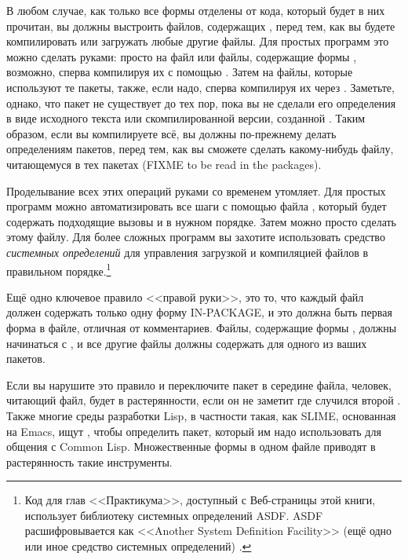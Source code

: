 В любом случае, как только все формы  отделены от кода, который будет в
них прочитан, вы должны выстроить  файлов, содержащих , перед
тем, как вы будете компилировать или загружать любые другие файлы. Для простых программ
это можно сделать руками: просто  на файл или файлы, содержащие формы
, возможно, сперва компилируя их с помощью . Затем
 на файлы, которые используют те пакеты, также, если надо, сперва компилируя их
через . Заметьте, однако, что пакет не существует до тех пор, пока вы
не сделали  его определения в виде исходного текста или скомпилированной
версии, созданной . Таким образом, если вы компилируете всё, вы должны
по-прежнему делать  определениям пакетов, перед тем, как вы сможете сделать
 какому-нибудь файлу, читающемуся в тех пакетах (FIXME to be read in
the packages).

Проделывание всех этих операций руками со временем утомляет.  Для простых программ можно
автоматизировать все шаги с помощью файла , который будет содержать
подходящие вызовы  и  в нужном порядке. Затем можно просто
сделать  этому файлу. Для более сложных программ вы захотите использовать
средство \textit{системных определений} для управления загрузкой и компиляцией файлов в
правильном порядке.\footnote{Код для глав <<Практикума>>, доступный с Веб-страницы этой
  книги, использует библиотеку системных определений ASDF. ASDF расшифровывается как
  <<Another System Definition Facility>> (ещё одно или иное средство системных определений)
  .}

Ещё одно ключевое правило <<правой руки>>, это то, что каждый файл должен содержать только
одну форму IN-PACKAGE, и это должна быть первая форма в файле, отличная от комментариев.
Файлы, содержащие формы , должны начинаться с , и все другие файлы должны содержать  для одного из
ваших пакетов.

Если вы нарушите это правило и переключите пакет в середине файла, человек, читающий файл,
будет в растерянности, если он не заметит где случился второй . Также
многие среды разработки Lisp, в частности такая, как SLIME, основанная на Emacs, ищут
, чтобы определить пакет, который им надо использовать для общения с
Common Lisp. Множественные формы  в одном файле приводят в растерянность
такие инструменты.

